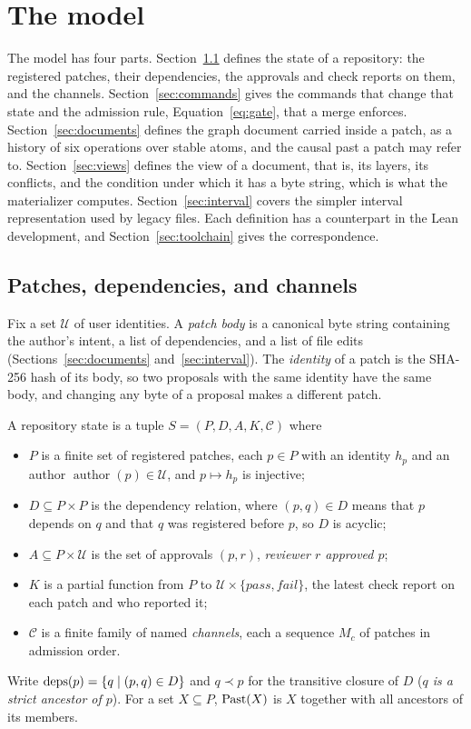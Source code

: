 \section{The model}\label{sec:model}
The model has four parts. Section~\ref{sec:channels} defines the state of a repository: the registered patches, their dependencies, the approvals and check reports on them, and the channels. Section~\ref{sec:commands} gives the commands that change that state and the admission rule, Equation~\ref{eq:gate}, that a merge enforces. Section~\ref{sec:documents} defines the graph document carried inside a patch, as a history of six operations over stable atoms, and the causal past a patch may refer to. Section~\ref{sec:views} defines the view of a document, that is, its layers, its conflicts, and the condition under which it has a byte string, which is what the materializer computes. Section~\ref{sec:interval} covers the simpler interval representation used by legacy files. Each definition has a counterpart in the Lean development, and Section~\ref{sec:toolchain} gives the correspondence.

\subsection{Patches, dependencies, and channels}\label{sec:channels}
Fix a set $\mathcal{U}$ of user identities. A \emph{patch body} is a canonical byte string containing the author's intent, a list of dependencies, and a list of file edits (Sections~\ref{sec:documents} and~\ref{sec:interval}). The \emph{identity} of a patch is the SHA-256 hash of its body, so two proposals with the same identity have the same body, and changing any byte of a proposal makes a different patch.

\begin{definition}\label{def:state}
A repository state is a tuple $S=(P,D,A,K,\mathcal{C})$ where
\begin{itemize}
\item $P$ is a finite set of registered patches, each $p\in P$ with an identity $h_p$ and an author $\operatorname{author}(p)\in\mathcal{U}$, and $p\mapsto h_p$ is injective;
\item $D\subseteq P\times P$ is the dependency relation, where $(p,q)\in D$ means that $p$ depends on $q$ and that $q$ was registered before $p$, so $D$ is acyclic;
\item $A\subseteq P\times\mathcal{U}$ is the set of approvals $(p,r)$, \emph{reviewer $r$ approved $p$};
\item $K$ is a partial function from $P$ to $\mathcal{U}\times\{\mathit{pass},\mathit{fail}\}$, the latest check report on each patch and who reported it;
\item $\mathcal{C}$ is a finite family of named \emph{channels}, each a sequence $M_c$ of patches in admission order.
\end{itemize}
\end{definition}
Write $\operatorname{deps}(p)=\{q\mid (p,q)\in D\}$ and $q\prec p$ for the transitive closure of $D$ (\emph{$q$ is a strict ancestor of $p$}). For a set $X\subseteq P$, $\operatorname{Past}(X)$ is $X$ together with all ancestors of its members.

